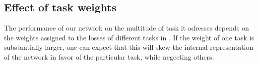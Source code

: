 \documentclass[10pt,twocolumn,letterpaper]{article}
\begin{document}




\begin{table*}
	\caption{Impact of the weight used for the normal estimation loss, when training for 7-tasks: Improving normal estimation comes at the cost of  decreasing  performance in the remaining tasks  (higher is better for all tasks). \label{table:resultsnrm}}
\end{table*}

\subsection{Effect of task weights}
The performance of our network on the multitude of task it adresses depends on the weights assigned to the losses of different tasks in . %
If the weight  of one task is substantially larger, one can expect that this will skew the internal representation of the network in favor of the particular task, while negecting others.
\end{document}
